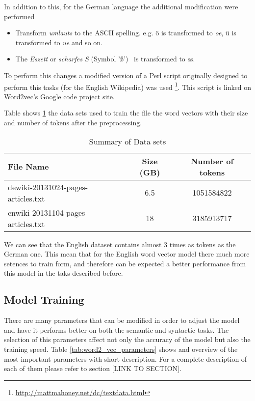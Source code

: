 In addition to this, for the German language the additional modification were
performed
\begin{itemize}
\item Transform \textit{umlauts} to the ASCII spelling.  e.g. \"{o} is
  transformed to \textit{oe},  \"{u} is transformed to \textit{ue}  and so
  on. 
\item The \textit{Eszett} or \textit{scharfes S} (Symbol '\ss') \  is transformed to ss.
\end{itemize}


To perform this changes a modified version of a Perl script originally
designed to perform this tasks (for the English Wikipedia) was used
\footnote{\url{http://mattmahoney.net/dc/textdata.html}}. This script is
linked on Word2vec's Google code project site.

Table shows \ref{tab:summ_dataset_germanword2vec} the data sets used
to train the file the word vectors with their size and number of tokens after
the preprocessing. 
  

 \begin{table}[h]

   \centering
   
   \caption{Summary of Data sets} 
   \label{tab:summ_dataset_germanword2vec}
   \small
   \begin{tabular}{ |l|c|c| }
   \hline           
    File Name &  Size (GB) & Number of tokens  \\  \hline           
    dewiki-20131024-pages-articles.txt & 6.5 &   1051584822 \\ 
    enwiki-20131104-pages-articles.txt & 18 &  3185913717  \\
    \hline

\end{tabular}
\end{table}

  

We can see that the English dataset contains almost 3 times as tokens as the
German one. This mean that for the English word vector model  there much more
setences to train form, and therefore can be expected a better performance
from this model in the taks described before. 
   
\subsection{Model Training}
\label{experiments:sub:Training}

There are many parameters that can be modified in order to adjust the model
and have it performs better on both the  semantic and syntactic tasks. The
selection of this parameters affect not only the accuracy of the model but
also the training speed.  Table \ref{tab:word2_vec_parameters} shows and
overview of the most important parameters with short description. For a
complete description of each of them please refer to section [LINK TO SECTION]. 


